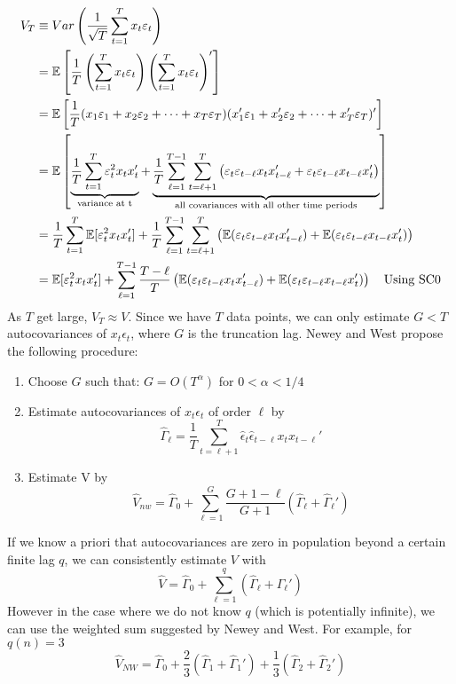 \documentclass[DIV=14,titlepage=false]{scrreprt}
\begin{document}
\begin{align*}
    V_T &\equiv Var\left(\frac{1}{\sqrt{T}}\sum_{t=1}^{T}x_t\varepsilon_t\right)\\
    &= \mathbb{E} \left[\frac{1}{T}\left(\sum_{t=1}^{T}x_t\varepsilon_t\right)\left(\sum_{t=1}^{T}x_t\varepsilon_t\right)'\right]\\
    &= \mathbb{E}\left[\frac{1}{T}(x_1\varepsilon_1+x_2\varepsilon_2+\dots+x_T\varepsilon_T)(x_1'\varepsilon_1+x_2'\varepsilon_2+\dots+x_T'\varepsilon_T)'\right]\\
    &= \mathbb{E}\left[\underbrace{\frac{1}{T}\sum_{t=1}^{T}\varepsilon_t^2x_tx_t'}_{\text{variance at t}}+\underbrace{\frac{1}{T}\sum_{\ell=1}^{T-1}\sum_{t=\ell+1}^{T}\left(\varepsilon_t\varepsilon_{t-\ell} x_t x_{t-\ell}'+ \varepsilon_t\varepsilon_{t-\ell} x_{t-\ell}x_t'\right)}_{\text{all covariances with all other time periods}}\right]\\
    &= \frac{1}{T}\sum_{t=1}^{T}\mathbb{E}[\varepsilon_t^2x_tx_t']+\frac{1}{T}\sum_{\ell=1}^{T-1}\sum_{t=\ell+1}^{T}\left(\mathbb{E}(\varepsilon_t\varepsilon_{t-\ell} x_t x_{t-\ell}')+ \mathbb{E}(\varepsilon_t\varepsilon_{t-\ell} x_{t-\ell}x_t')\right)\\
    &= \mathbb{E}[\varepsilon_t^2x_tx_t']+\sum_{\ell=1}^{T-1}\frac{T-\ell}{T}\left(\mathbb{E}(\varepsilon_t\varepsilon_{t-\ell} x_t x_{t-\ell}')+ \mathbb{E}(\varepsilon_t\varepsilon_{t-\ell} x_{t-\ell}x_t')\right)\quad \text{Using SC0}\\
\end{align*}
As $T$ get large, $V_T \approx V$. Since we have $T$ data points, we can only estimate $G<T$ autocovariances of $x_t\epsilon_t$, where $G$ is the truncation lag.  Newey and West propose the following procedure:
\begin{enumerate}
    \item Choose $G$ such that: $G=O(T^{\alpha})$ for $0<\alpha<1/4$
    \item Estimate autocovariances of $x_t\epsilon_t$ of order $\ell$ by \[\hat \Gamma_{\ell} = \frac{1}{T}\sum_{t=\ell+1}^{T}\hat\epsilon_t \hat\epsilon_{t-\ell}x_tx_{t-\ell}'\]
    \item Estimate V by \[ \hat V_{nw} = \hat\Gamma_0+\sum_{\ell=1}^{G}\frac{G+1-\ell}{G+1}\left(\hat\Gamma_{\ell}+\hat\Gamma_{\ell}'\right)\]
\end{enumerate}

If we know a priori that autocovariances are zero in population beyond a certain finite lag $q$,  we can consistently estimate $V$ with \[\hat V = \hat\Gamma_0+\sum_{\ell=1}^{q}\left(\hat\Gamma_{\ell}+\hat\Gamma_{\ell}'\right)\] However in the case where we do not know $q$ (which is potentially infinite), we can use the weighted sum suggested by Newey and West. For example, for $q(n) = 3$ \[\hat V_{NW} = \hat \Gamma_0 + \frac{2}{3}(\hat \Gamma_1 + \hat \Gamma_1 ') + \frac{1}{3}(\hat \Gamma_2 + \hat \Gamma_2 ')\]
\end{document}
